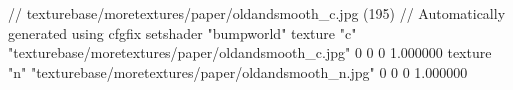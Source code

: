 // texturebase/moretextures/paper/oldandsmooth_c.jpg (195)
// Automatically generated using cfgfix
setshader "bumpworld"
texture "c" "texturebase/moretextures/paper/oldandsmooth_c.jpg" 0 0 0 1.000000
texture "n" "texturebase/moretextures/paper/oldandsmooth_n.jpg" 0 0 0 1.000000
